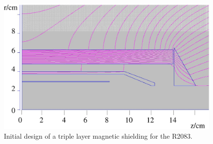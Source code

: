 \documentclass[12pt]{article}
\begin{document}
\begin{figure}[htbp]
\centering
\includegraphics[width=1\textwidth]{R2083_NETIC_hiperm49_CONETIC_standardDesign.eps}
\caption{\small{Initial design of a triple layer magnetic shielding for the R2083.}}
\label{R2083_Initial}
\end{figure}





%



 

\end{document}
